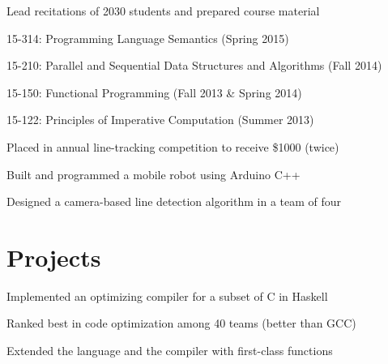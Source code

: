 \documentclass[letterpaper]{deedy-resume} %
\begin{document}
\begin{minipage}[t]{0.66\textwidth}
\begin{tightitemize}
\item Lead recitations of 20\textendash{}30 students and prepared course material
\item 15-314: Programming Language Semantics (Spring 2015)
\item 15-210: Parallel and Sequential Data Structures and Algorithms (Fall 2014)
\item 15-150: Functional Programming (Fall 2013 \& Spring 2014)
\item 15-122: Principles of Imperative Computation (Summer 2013)
\end{tightitemize}

\sectionspace %



\begin{tightitemize}
\item Placed  in annual line-tracking competition to receive \$1000 (twice)
\item Built and programmed a mobile robot using Arduino C++
\item Designed a camera-based line detection algorithm in a team of four
\end{tightitemize}

\sectionspace %


\section{Projects}


\begin{tightitemize}
\item Implemented an optimizing compiler for a subset of C in Haskell
\item Ranked  best in code optimization among 40 teams (better than GCC)
\item Extended the language and the compiler with first-class functions
\end{tightitemize}


\end{minipage}
\end{document}
